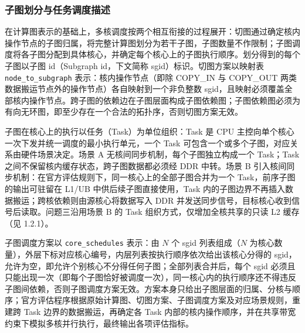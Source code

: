 \subsubsection{子图划分与任务调度描述}
在计算图表示的基础上，多核调度按两个相互衔接的过程展开：切图通过确定核内操作节点的子图归属，将完整计算图划分为若干子图，子图数量不作限制；子图调度将各子图分配到具体核心，并确定每个核心上的子图执行顺序。划分得到的每个子图以子图 id（Subgraph id，下文简称 sgid）标识。切图方案以映射表 \texttt{node\_to\_subgraph} 表示：核内操作节点（即除 COPY\_IN 与 COPY\_OUT 两类数据搬运节点外的操作节点）各自映射到一个非负整数 sgid，且映射必须覆盖全部核内操作节点。跨子图的依赖边在子图层面构成子图依赖图；子图依赖图必须为有向无环图，即至少存在一个合法的拓扑序，否则切图方案无效。

子图在核心上的执行以任务（Task）为单位组织：Task 是 CPU 主控向单个核心一次下发并统一调度的最小执行单元，一个 Task 可包含一个或多个子图，对应关系由硬件场景决定。场景 A 无核间同步机制，每个子图独立构成一个 Task；Task 之间不保留核内缓存状态，跨子图数据都必须经 DDR 中转。场景 B 引入核间同步机制：在官方评估规则下，同一核心上的全部子图合并为一个 Task，前序子图的输出可驻留在 L1/UB 中供后续子图直接使用，Task 内的子图边界不再插入数据搬运；跨核依赖则由源核心将数据写入 DDR 并发送同步信号，目标核心收到信号后读取。问题三沿用场景 B 的 Task 组织方式，仅增加全核共享的只读 L2 缓存（见 1.2.1）。

子图调度方案以 \texttt{core\_schedules} 表示：由 $N$ 个 sgid 列表组成（$N$ 为核心数量），外层下标对应核心编号，内层列表按执行顺序依次给出该核心分得的 sgid，允许为空，即允许个别核心不分得任何子图；全部列表合并后，每个 sgid 必须且只能出现一次（即每个子图恰好被调度一次），同一核心内的执行顺序还不得违反子图间依赖，否则子图调度方案无效。方案本身只给出子图层面的归属、分核与顺序；官方评估程序根据原始计算图、切图方案、子图调度方案及对应场景规则，重建跨 Task 边界的数据搬运，再确定各 Task 内部的核内操作顺序，并在共享带宽约束下模拟多核并行执行，最终输出各项评估指标。

